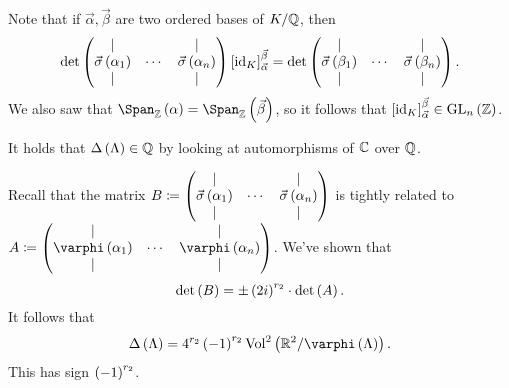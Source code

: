 \documentclass[11pt]{karticle}
\begin{document}
\begin{remark}
Note that if $\vec{\alpha}, \vec{\beta}$ are two ordered bases of $K/\mathbb{Q}$, then
\[\det\begin{pmatrix}\vert & & \vert \\ \vec{\sigma}\left( \alpha_1 \right) & \cdots & \vec{\sigma}\left( \alpha_n \right) \\ \vert & & \vert\end{pmatrix} \left[ \operatorname{id}_K \right]^{\vec{\beta}}_{\vec{\alpha}} = \det\begin{pmatrix}\vert & & \vert \\ \vec{\sigma}\left( \beta_1 \right) & \cdots & \vec{\sigma}\left( \beta_n \right) \\ \vert & & \vert\end{pmatrix} \text{.}\]
We also saw that $\Span_{\mbb{Z}}\prs{\alpha} = \Span_{\mbb{Z}}\prs{\vec{\beta}}$, so it follows that $\left[ \operatorname{id}_K \right]^{\vec{\beta}}_{\vec{\alpha}} \in \mathrm{GL}_n\left( \mathbb{Z} \right)$.
\end{remark}

\begin{remark}
It holds that $\Delta\left( \Lambda \right) \in \mathbb{Q}$ by looking at automorphisms of $\mathbb{C}$ over $\mathbb{Q}$.
\end{remark}

\begin{remark}
Recall that the matrix $B \coloneqq \begin{pmatrix}\vert & & \vert \\ \vec{\sigma}\left( \alpha_1 \right) & \cdots & \vec{\sigma}\left( \alpha_n \right) \\ \vert & & \vert\end{pmatrix}$ is tightly related to $A \coloneqq \pmat{\vert & & \vert \\ \varphi\prs{\alpha_1} & \cdots & \varphi\prs{\alpha_n} \\ \vert & & \vert}$. We've shown that
\[\det\left( B \right) = \pm \left( 2 i \right)^{r_2} \cdot \det\left( A \right) \text{.}\]
It follows that
\[\Delta\prs{\Lambda} = 4^{r_2} \prs{-1}^{r_2} \mrm{Vol}^2\prs{\mbb{R}^2 / \varphi\prs{\Lambda}} \text{.}\]
This has sign $\left( -1 \right)^{r_2}$.
\end{remark}
\end{document}
